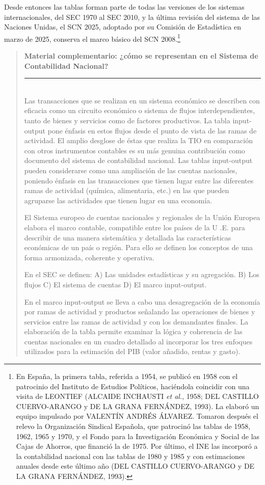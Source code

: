 \documentclass[10pt,a4paper]{article}
\newenvironment{specialblock}[1]{%
      \begin{quote} %
      \small %
      \noindent\textbf{#1}\\[-0.3em] %
      \rule{\linewidth}{0.4pt}\\[0.6em]}{
      \end{quote}}
\begin{document}
Desde entonces las tablas forman parte de todas las versiones de los sistemas internacionales, del SEC 1970 al SEC 2010, y la última revisión del sistema de las Naciones Unidas, el SCN 2025, adoptado por su Comisión de Estadística en marzo de 2025, conserva el marco básico del SCN 2008.\footnote{%
  En España, la primera tabla, referida a 1954, se publicó en 1958 con el patrocinio del Instituto de Estudios Políticos, haciéndola coincidir con una visita de LEONTIEF (ALCAIDE INCHAUSTI \textit{et al.}, 1958; DEL CASTILLO CUERVO-ARANGO y DE LA GRANA FERNÁNDEZ, 1993). La elaboró un equipo impulsado por VALENTÍN ANDRÉS ÁLVAREZ. Tomaron después el relevo la Organización Sindical Española, que patrocinó las tablas de 1958, 1962, 1965 y 1970, y el Fondo para la Investigación Económica y Social de las Cajas de Ahorros, que financió la de 1975. Por último, el INE las incorporó a la contabilidad nacional con las tablas de 1980 y 1985 y con estimaciones anuales desde este último año (DEL CASTILLO CUERVO-ARANGO y DE LA GRANA FERNÁNDEZ, 1993).
}

\begin{specialblock}{\textbf{Material complementario:} ¿cómo se representan en el Sistema de Contabilidad Nacional?}
  Las transacciones que se realizan en un sistema económico se describen con eficacia como un circuito económico o sistema de flujos interdependientes, tanto de bienes y servicios como de factores productivos. La tabla input-output pone énfasis en estos flujos desde el punto de vista de las ramas de actividad. El amplio desglose de éstas que realiza la TIO en comparación con otros instrumentos contables es su más genuina contribución como documento del sistema de contabilidad nacional. Las tablas input-output pueden considerarse como una ampliación de las cuentas nacionales, poniendo énfasis en las transacciones que tienen lugar entre las diferentes ramas de actividad (química, alimentaria, etc.) en las que pueden agruparse las actividades que tienen lugar en una economía. 

  El Sistema europeo de cuentas nacionales y regionales de la Unión Europea elabora el marco contable, compatible entre los países de la U .E. para describir de una manera sistemática y detallada las características económicas de un país o región. Para ello se definen los conceptos de una forma armonizada, coherente y operativa.

  En el SEC se definen:
  A) Las unidades estadísticas y su agregación.
  B) Los flujos 
  C) El sistema de cuentas
  D) El marco input-output. 

  En el marco input-output se lleva a cabo una desagregación de la economía por ramas de actividad y productos señalando las operaciones de bienes y servicios entre las ramas de actividad y con los demandantes finales. La elaboración de la tabla permite examinar la lógica y coherencia de las cuentas nacionales en un cuadro detallado al incorporar los tres enfoques utilizados para la estimación del PIB (valor añadido, rentas y gasto).
\end{specialblock}
\end{document}

